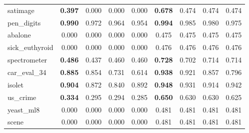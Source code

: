 \begin{figure}[ht]
\begin{tabular}{p{22mm}|*4{p{14mm}}|*4{p{14mm}}}
        satimage&\multicolumn{1}{c}{\textbf{0.397}}&\multicolumn{1}{c}{0.000}&\multicolumn{1}{c}{0.000}&\multicolumn{1}{c|}{0.000}&\multicolumn{1}{c}{\textbf{0.678}}&\multicolumn{1}{c}{0.474}&\multicolumn{1}{c}{0.474}&\multicolumn{1}{c}{0.474}\\
        pen\_digits&\multicolumn{1}{c}{\textbf{0.990}}&\multicolumn{1}{c}{0.972}&\multicolumn{1}{c}{0.964}&\multicolumn{1}{c|}{0.954}&\multicolumn{1}{c}{\textbf{0.994}}&\multicolumn{1}{c}{0.985}&\multicolumn{1}{c}{0.980}&\multicolumn{1}{c}{0.975}\\
        abalone&\multicolumn{1}{c}{0.000}&\multicolumn{1}{c}{0.000}&\multicolumn{1}{c}{0.000}&\multicolumn{1}{c|}{0.000}&\multicolumn{1}{c}{0.475}&\multicolumn{1}{c}{0.475}&\multicolumn{1}{c}{0.475}&\multicolumn{1}{c}{0.475}\\
        sick\_euthyroid&\multicolumn{1}{c}{0.000}&\multicolumn{1}{c}{0.000}&\multicolumn{1}{c}{0.000}&\multicolumn{1}{c|}{0.000}&\multicolumn{1}{c}{0.476}&\multicolumn{1}{c}{0.476}&\multicolumn{1}{c}{0.476}&\multicolumn{1}{c}{0.476}\\
        spectrometer&\multicolumn{1}{c}{\textbf{0.486}}&\multicolumn{1}{c}{0.437}&\multicolumn{1}{c}{0.460}&\multicolumn{1}{c|}{0.460}&\multicolumn{1}{c}{\textbf{0.728}}&\multicolumn{1}{c}{0.702}&\multicolumn{1}{c}{0.714}&\multicolumn{1}{c}{0.714}\\
        car\_eval\_34&\multicolumn{1}{c}{\textbf{0.885}}&\multicolumn{1}{c}{0.854}&\multicolumn{1}{c}{0.731}&\multicolumn{1}{c|}{0.614}&\multicolumn{1}{c}{\textbf{0.938}}&\multicolumn{1}{c}{0.921}&\multicolumn{1}{c}{0.857}&\multicolumn{1}{c}{0.796}\\
        isolet&\multicolumn{1}{c}{\textbf{0.904}}&\multicolumn{1}{c}{0.872}&\multicolumn{1}{c}{0.840}&\multicolumn{1}{c|}{0.892}&\multicolumn{1}{c}{\textbf{0.948}}&\multicolumn{1}{c}{0.931}&\multicolumn{1}{c}{0.914}&\multicolumn{1}{c}{0.942}\\
        us\_crime&\multicolumn{1}{c}{\textbf{0.334}}&\multicolumn{1}{c}{0.295}&\multicolumn{1}{c}{0.294}&\multicolumn{1}{c|}{0.285}&\multicolumn{1}{c}{\textbf{0.650}}&\multicolumn{1}{c}{0.630}&\multicolumn{1}{c}{0.630}&\multicolumn{1}{c}{0.625}\\
        yeast\_ml8&\multicolumn{1}{c}{0.000}&\multicolumn{1}{c}{0.000}&\multicolumn{1}{c}{0.000}&\multicolumn{1}{c|}{0.000}&\multicolumn{1}{c}{0.481}&\multicolumn{1}{c}{0.481}&\multicolumn{1}{c}{0.481}&\multicolumn{1}{c}{0.481}\\
        scene&\multicolumn{1}{c}{0.000}&\multicolumn{1}{c}{0.000}&\multicolumn{1}{c}{0.000}&\multicolumn{1}{c|}{0.000}&\multicolumn{1}{c}{0.481}&\multicolumn{1}{c}{0.481}&\multicolumn{1}{c}{0.481}&\multicolumn{1}{c}{0.481}\\

\end{tabular}
\end{figure}
